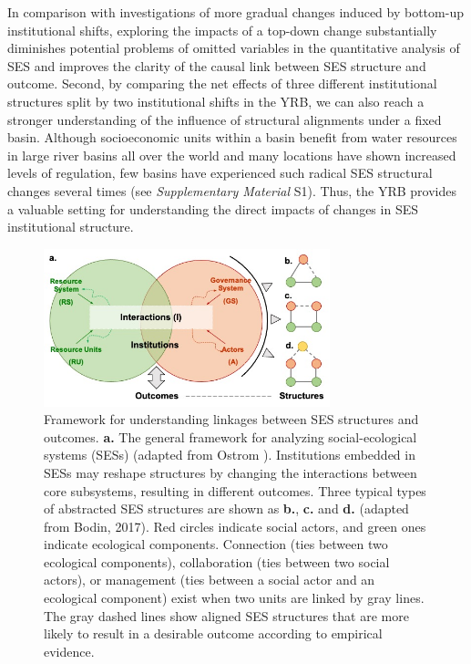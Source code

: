 \documentclass{article}
\begin{document}
In comparison with investigations of more gradual changes induced by bottom-up institutional shifts, exploring the impacts of a top-down change substantially diminishes potential problems of omitted variables in the quantitative analysis of SES and improves the clarity of the causal link between SES structure and outcome.
Second, by comparing the net effects of three different institutional structures split by two institutional shifts in the YRB, we can also reach a stronger understanding of the influence of structural alignments under a fixed basin. Although socioeconomic units within a basin benefit from water resources in large river basins all over the world and many locations have shown increased levels of regulation, few basins have experienced such radical SES structural changes several times (see \textit{Supplementary Material} S1). Thus, the YRB provides a valuable setting for understanding the direct impacts of changes in SES institutional structure.

\begin{figure}
	\centering
	\includegraphics[width=8.3cm]{../../../figs/diagrams/framework.jpg}
	\caption{
		Framework for understanding linkages between SES structures and outcomes.
		\textbf{a.} The general framework for analyzing social-ecological systems (SESs) (adapted from Ostrom \cite{ostromGeneralFrameworkAnalyzing2009}). Institutions embedded in SESs may reshape structures by changing the interactions between core subsystems, resulting in different outcomes.
        Three typical types of abstracted SES structures are shown as \textbf{b.}, \textbf{c.} and \textbf{d.} (adapted from Bodin, 2017)\cite{bodinCollaborativeenvironmentalgovernance2017}. Red circles indicate social actors, and green ones indicate ecological components. Connection (ties between two ecological components), collaboration (ties between two social actors), or management (ties between a social actor and an ecological component) exist when two units are linked by gray lines. The gray dashed lines show aligned SES structures that are more likely to result in a desirable outcome according to empirical evidence.
	}
    \label{fig:framework}
\end{figure}
\end{document}
